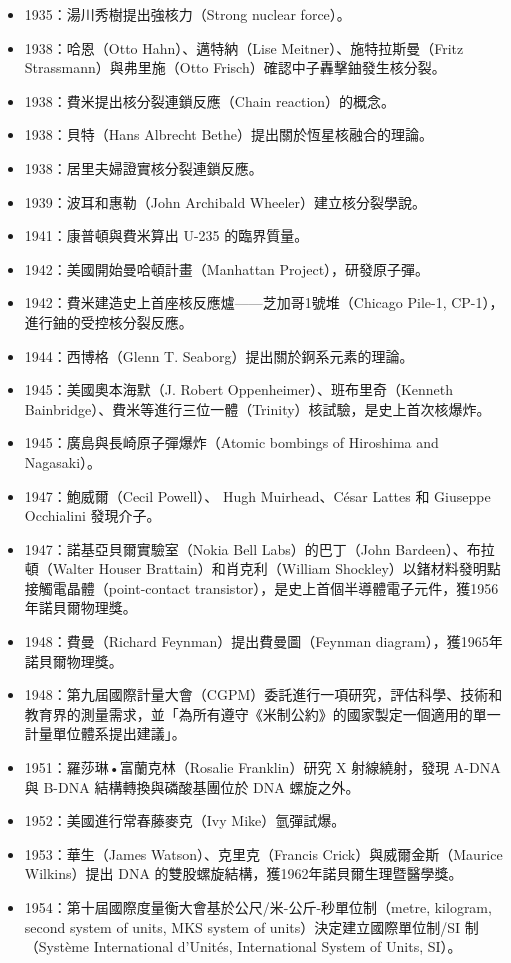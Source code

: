 \documentclass[a4paper,12pt]{article}
\begin{document}
\begin{itemize}
\item 1935：湯川秀樹提出強核力（Strong nuclear force）。
\item 1938：哈恩（Otto Hahn）、邁特納（Lise Meitner）、施特拉斯曼（Fritz Strassmann）與弗里施（Otto Frisch）確認中子轟擊鈾發生核分裂。
\item 1938：費米提出核分裂連鎖反應（Chain reaction）的概念。
\item 1938：貝特（Hans Albrecht Bethe）提出關於恆星核融合的理論。
\item 1938：居里夫婦證實核分裂連鎖反應。
\item 1939：波耳和惠勒（John Archibald Wheeler）建立核分裂學說。
\item 1941：康普頓與費米算出 U-235 的臨界質量。
\item 1942：美國開始曼哈頓計畫（Manhattan Project），研發原子彈。
\item 1942：費米建造史上首座核反應爐——芝加哥1號堆（Chicago Pile-1, CP-1），進行鈾的受控核分裂反應。
\item 1944：西博格（Glenn T. Seaborg）提出關於錒系元素的理論。
\item 1945：美國奧本海默（J. Robert Oppenheimer）、班布里奇（Kenneth Bainbridge）、費米等進行三位一體（Trinity）核試驗，是史上首次核爆炸。
\item 1945：廣島與長崎原子彈爆炸（Atomic bombings of Hiroshima and Nagasaki）。
\item 1947：鮑威爾（Cecil Powell）、 Hugh Muirhead、César Lattes 和 Giuseppe Occhialini 發現介子。
\item 1947：諾基亞貝爾實驗室（Nokia Bell Labs）的巴丁（John Bardeen）、布拉頓（Walter Houser Brattain）和肖克利（William Shockley）以鍺材料發明點接觸電晶體（point-contact transistor），是史上首個半導體電子元件，獲1956年諾貝爾物理獎。
\item 1948：費曼（Richard Feynman）提出費曼圖（Feynman diagram），獲1965年諾貝爾物理獎。
\item 1948：第九屆國際計量大會（CGPM）委託進行一項研究，評估科學、技術和教育界的測量需求，並「為所有遵守《米制公約》的國家製定一個適用的單一計量單位體系提出建議」。
\item 1951：羅莎琳•富蘭克林（Rosalie Franklin）研究 X 射線繞射，發現 A-DNA 與 B-DNA 結構轉換與磷酸基團位於 DNA 螺旋之外。
\item 1952：美國進行常春藤麥克（Ivy Mike）氫彈試爆。
\item 1953：華生（James Watson）、克里克（Francis Crick）與威爾金斯（Maurice Wilkins）提出 DNA 的雙股螺旋結構，獲1962年諾貝爾生理暨醫學獎。
\item 1954：第十屆國際度量衡大會基於公尺/米-公斤-秒單位制（metre, kilogram, second system of units, MKS system of units）決定建立國際單位制/SI 制（Système International d'Unités, International System of Units, SI）。

\end{itemize}
\end{document}

